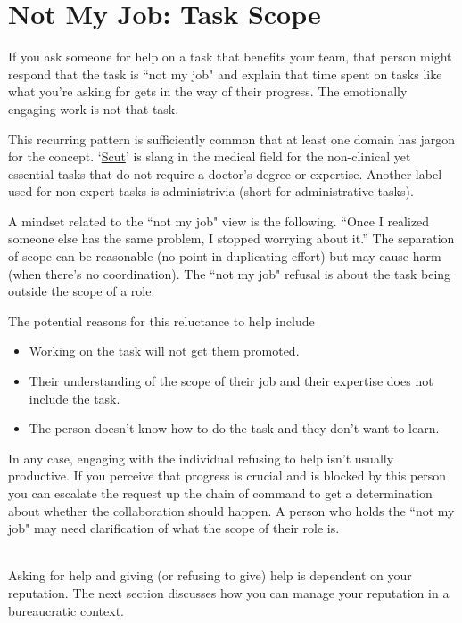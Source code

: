 \section{Not My Job: Task Scope}


If you ask someone for help on a task that benefits your team, that person might respond that the task is ``not my job" and explain that time spent on tasks like what you're asking for gets in the way of their progress. The emotionally engaging work is not that task.

This recurring pattern is sufficiently common that at least one domain has jargon for the concept.
`\href{https://www.urbandictionary.com/define.php?term=scut}{Scut}'\iftoggle{WPinmargin}{\marginpar{[Urbandictionary.com] scut}}{}
is  slang in the medical field for the non-clinical yet essential tasks that do not require a doctor's degree or expertise.
Another label used for non-expert tasks is administrivia (short for administrative tasks).

A mindset related to the ``not my job" view is the following.
``Once I realized someone else has the same problem, I stopped worrying about it.'' The separation of scope can be reasonable (no point in duplicating effort) but may cause harm (when there's no coordination). The ``not my job" refusal is  about the task being outside the scope of a role. 

The potential reasons for this reluctance to help include
\begin{itemize}
    \item Working on the task will not get them promoted.
    \item Their understanding of the scope of their job and their expertise does not include the task.
    \item The person doesn't know how to do the task and they don't want to learn.
\end{itemize}
In any case, engaging with the individual refusing to help isn't usually productive. 
If you perceive that progress is crucial and is blocked by this person you can escalate the request up the chain of command to get a determination about whether the collaboration should happen.
%
%
A person who holds the ``not my job" may need clarification of what the scope of their role is.

\ \\


Asking for help and giving (or refusing to give) help is dependent on your reputation.
The next section discusses how you can manage your reputation in a bureaucratic context.